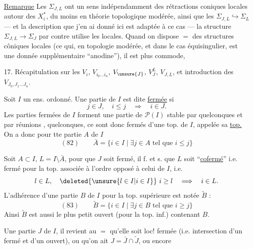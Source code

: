 \uline{Remarque} Les $\Sigma_{J,L}$ ont un sens  indépendamment des rétractions coniques locales autour des $X_i^*$, du moins en théorie topologique modérée, ainsi que les $\Sigma_{J,L}\hookrightarrow\Sigma_L$ --- et la description que j'en ai donné ici est adaptée à ce cas --- la structure $\Sigma_{J,L}\to\Sigma_J$ par contre utilise les     locales. Quand on dispose $=$ des structures côniques locales (ce qui, en topologie modérée, et dans le cas équisingulier, est une donnée supplémentaire ``anodine''), il est plus commode,


17. Récapitulation sur les $V_i$, $V_{i_0\ldots i_n}$, $V_{\unsure{J}}$, $V_J^L$, $V_{J,L}$, et introduction des $V_{J_0,J_1\ldots J_n}$.

Soit $I$ un ens. ordonné. Une partie  de $I$ est dite \uline{fermée} si
\[j\in J,\quad i\leq j\quad\Longrightarrow\quad i\in J.\]
Les parties fermées de $I$ forment une  partie de $\mathcal P(I)$ stable par  quelconques et par réunions , quelconques, ce sont donc   fermés d'une top. de $I$, appelée sa \uline{top.}   On a donc pour tte partie $A$ de $I$
\[
(82)\qquad\bar A=\{i\in I\mid\exists j\in A\text{ tel que }i\leq j\}
\]

 Soit $A\subset I$, $L=I\setminus\bar A$, pour que $J$ soit fermé,  il f. et s. que $L$ soit ``\uline{cofermé}'' i.e. fermé pour la top. associée à l'ordre opposé à  celui de $I$, i.e.
\[l\in L,\quad\deleted{\unsure{l\in I|i\in I}}\ i\geq l\quad\Longrightarrow\quad i\in L.\]
L'adhérence d'une partie $B$ de $I$ pour la top. supérieure est notée $\widetilde B$ :
\[
(83)\qquad\widetilde B=\{i\in I\mid\exists j\in B\text{ tel que }i\geq j\}
\]
 Ainsi $\widetilde B$ est aussi le plus petit ouvert (pour la top. inf.) contenant $B$.

 Une partie $J$ de $I$, il revient au $=$ qu'elle soit loc! fermée (i.e. intersection d'un fermé et d'un ouvert), ou qu'on ait $J=\bar J\cap\widetilde J$, ou encore

